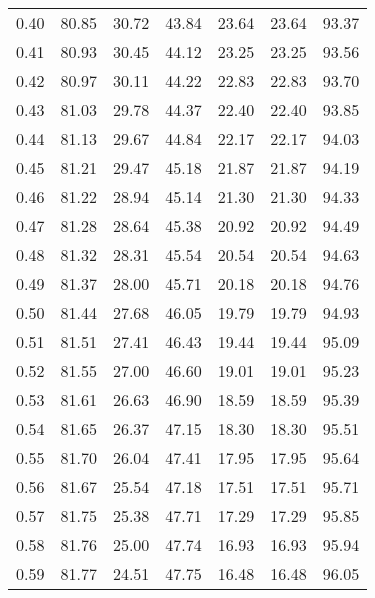\begin{tabular}{|c|c|c|c|c|c|c|}
      0.40 &     80.85 &     30.72 &      43.84 &   23.64 &      23.64 &         93.37 \\
      0.41 &     80.93 &     30.45 &      44.12 &   23.25 &      23.25 &         93.56 \\
      0.42 &     80.97 &     30.11 &      44.22 &   22.83 &      22.83 &         93.70 \\
      0.43 &     81.03 &     29.78 &      44.37 &   22.40 &      22.40 &         93.85 \\
      0.44 &     81.13 &     29.67 &      44.84 &   22.17 &      22.17 &         94.03 \\
      0.45 &     81.21 &     29.47 &      45.18 &   21.87 &      21.87 &         94.19 \\
      0.46 &     81.22 &     28.94 &      45.14 &   21.30 &      21.30 &         94.33 \\
      0.47 &     81.28 &     28.64 &      45.38 &   20.92 &      20.92 &         94.49 \\
      0.48 &     81.32 &     28.31 &      45.54 &   20.54 &      20.54 &         94.63 \\
      0.49 &     81.37 &     28.00 &      45.71 &   20.18 &      20.18 &         94.76 \\
      0.50 &     81.44 &     27.68 &      46.05 &   19.79 &      19.79 &         94.93 \\
      0.51 &     81.51 &     27.41 &      46.43 &   19.44 &      19.44 &         95.09 \\
      0.52 &     81.55 &     27.00 &      46.60 &   19.01 &      19.01 &         95.23 \\
      0.53 &     81.61 &     26.63 &      46.90 &   18.59 &      18.59 &         95.39 \\
      0.54 &     81.65 &     26.37 &      47.15 &   18.30 &      18.30 &         95.51 \\
      0.55 &     81.70 &     26.04 &      47.41 &   17.95 &      17.95 &         95.64 \\
      0.56 &     81.67 &     25.54 &      47.18 &   17.51 &      17.51 &         95.71 \\
      0.57 &     81.75 &     25.38 &      47.71 &   17.29 &      17.29 &         95.85 \\
      0.58 &     81.76 &     25.00 &      47.74 &   16.93 &      16.93 &         95.94 \\
      0.59 &     81.77 &     24.51 &      47.75 &   16.48 &      16.48 &         96.05 \\

\end{tabular}
